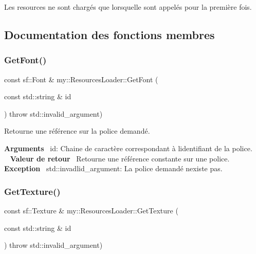 Les resources ne sont chargés que lorsqu\textquotesingle{}elle sont appelés pour la première fois. 

\subsection{Documentation des fonctions membres}
\mbox{\label{classmy_1_1ResourcesLoader_a3fd370dcde54accc2dfb22772c6370b6}} 
\subsubsection{\texorpdfstring{Get\+Font()}{GetFont()}}
{\footnotesize\ttfamily const sf\+::\+Font \& my\+::\+Resources\+Loader\+::\+Get\+Font (\begin{DoxyParamCaption}\item[{const std\+::string \&}]{id }\end{DoxyParamCaption}) throw  std\+::invalid\+\_\+argument) \hspace{0.3cm}{\ttfamily [static]}}



Retourne une référence sur la police demandé. 

{\bfseries Arguments}~\newline
 id\+: Chaine de caractère correspondant à l\textquotesingle{}identifiant de la police. ~\newline
~\newline
 {\bfseries Valeur de retour}~\newline
 Retourne une référence constante sur une police. ~\newline
~\newline
 {\bfseries Exception}~\newline
 std\+::invadlid\+\_\+argument\+: La police demandé n\textquotesingle{}existe pas. \mbox{\label{classmy_1_1ResourcesLoader_a99c16ed7b9c9772e6181fd79b7417d87}} 
\subsubsection{\texorpdfstring{Get\+Texture()}{GetTexture()}}
{\footnotesize\ttfamily const sf\+::\+Texture \& my\+::\+Resources\+Loader\+::\+Get\+Texture (\begin{DoxyParamCaption}\item[{const std\+::string \&}]{id }\end{DoxyParamCaption}) throw  std\+::invalid\+\_\+argument) \hspace{0.3cm}{\ttfamily [static]}}



